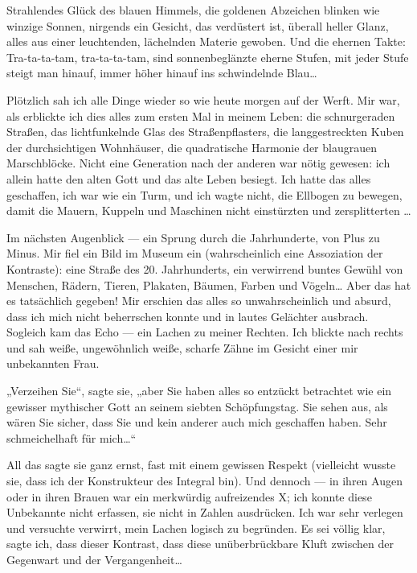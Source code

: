Strahlendes Glück des blauen Himmels, die goldenen Abzeichen
blinken wie winzige Sonnen, nirgends ein Gesicht, das verdüstert
ist, überall heller Glanz, alles aus einer leuchtenden, lächelnden
Materie gewoben. Und die ehernen Takte: Tra-ta-ta-tam,
tra-ta-ta-tam, sind sonnenbeglänzte eherne Stufen, mit jeder Stufe
steigt man hinauf, immer höher hinauf ins schwindelnde Blau\ldots{}

Plötzlich sah ich alle Dinge wieder so wie heute morgen auf der
Werft. Mir war, als erblickte ich dies alles zum ersten Mal in
meinem Leben: die schnurgeraden Straßen, das lichtfunkelnde Glas
des Straßenpflasters, die langgestreckten Kuben der durchsichtigen
Wohnhäuser, die quadratische Harmonie der blaugrauen Marschblöcke.
Nicht eine Generation nach der anderen war nötig gewesen: ich
allein hatte den alten Gott und das alte Leben besiegt. Ich hatte
das alles geschaffen, ich war wie ein Turm, und ich wagte nicht,
die Ellbogen zu bewegen, damit die Mauern, Kuppeln und Maschinen
nicht einstürzten und zersplitterten \ldots{}

Im nächsten Augenblick —
ein Sprung durch die Jahrhunderte, von Plus zu Minus. Mir fiel ein Bild im Museum ein
(wahrscheinlich eine Assoziation der Kontraste): eine Straße des
20. Jahrhunderts, ein verwirrend buntes Gewühl von Menschen,
Rädern, Tieren, Plakaten, Bäumen, Farben und Vögeln\ldots{} Aber das hat
es tatsächlich gegeben! Mir erschien das alles so unwahrscheinlich
und absurd, dass ich mich nicht beherrschen konnte und in lautes
Gelächter ausbrach. Sogleich kam das Echo — ein Lachen zu meiner
Rechten. Ich blickte nach rechts und sah weiße, ungewöhnlich weiße,
scharfe Zähne im Gesicht einer mir unbekannten Frau.

„Verzeihen Sie“, sagte sie, „aber Sie haben alles so entzückt
betrachtet wie ein gewisser mythischer Gott an seinem siebten
Schöpfungstag. Sie sehen aus, als wären Sie sicher, dass Sie und
kein anderer auch mich geschaffen haben. Sehr schmeichelhaft für
mich\ldots{}“

All das sagte sie ganz ernst, fast mit einem gewissen
Respekt (vielleicht wusste sie, dass ich der Konstrukteur des
Integral bin). Und dennoch — in ihren Augen oder in ihren Brauen
war ein merkwürdig aufreizendes X; ich konnte diese Unbekannte
nicht erfassen, sie nicht in Zahlen ausdrücken. Ich war sehr
verlegen und versuchte verwirrt, mein Lachen logisch zu begründen.
Es sei völlig klar, sagte ich, dass dieser Kontrast, dass diese
unüberbrückbare Kluft zwischen der Gegenwart und der
Vergangenheit\ldots{}

